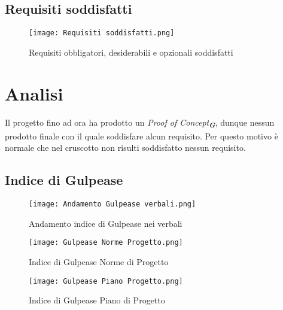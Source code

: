\newpage

\subsection{Requisiti soddisfatti}
\label{subsec:Requisiti soddisfatti}

\begin{figure}[h] 
    \centering
    \texttt{[image: Requisiti soddisfatti.png]}
    \caption{Requisiti obbligatori, desiderabili e opzionali soddisfatti} 
    \label{fig: Requisiti soddisfatti}
\end{figure}

\section*{Analisi}
Il progetto fino ad ora ha prodotto un \emph{Proof of Concept}\textsubscript{\textbf{\textit{G}}}, dunque nessun prodotto finale con il quale soddisfare alcun requisito.
Per questo motivo è normale che nel cruscotto non risulti soddisfatto nessun requisito.

\newpage

\subsection{Indice di Gulpease}
\label{subsec:Indice di Gulpease}

\begin{figure}[h!] 
    \centering
    \texttt{[image: Andamento Gulpease verbali.png]}
    \caption{Andamento indice di Gulpease nei verbali} 
    \label{fig: Andamento Gulpease verbali}
\end{figure}

\begin{figure}[h!]
    \centering

    \begin{minipage}{.4\textwidth}
        \centering
        \texttt{[image: Gulpease Norme Progetto.png]}
        \caption{}{Indice di Gulpease Norme di Progetto}
        \label{fig:Gulpease Norme Progetto}
    \end{minipage}%
    \begin{minipage}{.4\textwidth}
        \centering
        \texttt{[image: Gulpease Piano Progetto.png]}
        \caption{}{Indice di Gulpease Piano di Progetto}
        \label{fig:Gulpease Piano Progetto}
    \end{minipage}

\end{figure}

